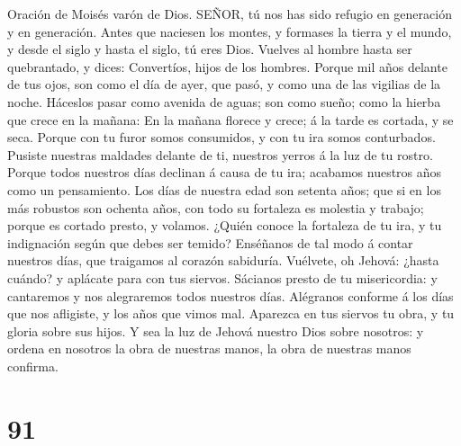  Oración de Moisés varón de Dios. SEÑOR, tú nos has sido
refugio en generación y en generación.  Antes que naciesen
los montes, y formases la tierra y el mundo, y desde el siglo y hasta el
siglo, tú eres Dios.  Vuelves al hombre hasta ser
quebrantado, y dices: Convertíos, hijos de los hombres. 
Porque mil años delante de tus ojos, son como el día de ayer, que pasó,
y como una de las vigilias de la noche.  Háceslos pasar como
avenida de aguas; son como sueño; como la hierba que crece en la mañana:
 En la mañana florece y crece; á la tarde es cortada, y se
seca.  Porque con tu furor somos consumidos, y con tu ira
somos conturbados.  Pusiste nuestras maldades delante de ti,
nuestros yerros á la luz de tu rostro.  Porque todos
nuestros días declinan á causa de tu ira; acabamos nuestros años como un
pensamiento.  Los días de nuestra edad son setenta años;
que si en los más robustos son ochenta años, con todo su fortaleza es
molestia y trabajo; porque es cortado presto, y volamos. 
¿Quién conoce la fortaleza de tu ira, y tu indignación según que debes
ser temido?  Enséñanos de tal modo á contar nuestros días,
que traigamos al corazón sabiduría.  Vuélvete, oh Jehová:
¿hasta cuándo? y aplácate para con tus siervos.  Sácianos
presto de tu misericordia: y cantaremos y nos alegraremos todos nuestros
días.  Alégranos conforme á los días que nos afligiste, y
los años que vimos mal.  Aparezca en tus siervos tu obra, y
tu gloria sobre sus hijos.  Y sea la luz de Jehová nuestro
Dios sobre nosotros: y ordena en nosotros la obra de nuestras manos, la
obra de nuestras manos confirma.

\hypertarget{section-90}{%
\section{91}\label{section-90}}

